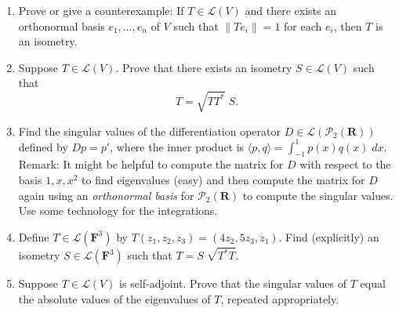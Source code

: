 \documentclass[12pt]{article}
\begin{document}
\begin{enumerate}
\item Prove or give a counterexample:  If $T \in \mathcal{L}(V)$ and there exists an orthonormal basis $e_1, \ldots , e_n$ of  $V$ such that $\|Te_i\| = 1$ for each $e_i$, then $T$ is an isometry.

\item Suppose $T \in \mathcal{L}(V)$.  Prove that there exists an isometry $S \in \mathcal{L}(V)$ such that
    \[
        T = \sqrt{TT^*}\;S.
    \]


\item Find the singular values of the differentiation operator $D \in \mathcal{L}(\mathcal{P}_2(\mathbf{R}))$ defined by $Dp = p'$, where the inner product is $\langle p , q \rangle = \int_{-1}^1 p(x)q(x)\;dx$.\\
    Remark: It might be helpful to compute the matrix for $D$ with respect to the basis $1, x, x^2$ to find eigenvalues (easy) and then compute the matrix for $D$ again using an \emph{orthonormal basis} for $\mathcal{P}_2(\mathbf{R})$ to compute the singular values.  Use some technology for the integrations.

\item Define $T \in \mathcal{L}(\mathbf{F}^3)$ by $T(z_1,z_2,z_3) = ( 4z_2 , 5z_3 , z_1 )$. Find (explicitly) an isometry $S \in \mathcal{L}(\mathbf{F}^3)$ such that $T = S\;\sqrt{T^*T}$.

\item Suppose $T \in \mathcal{L}(V)$ is self-adjoint.  Prove that the singular values of $T$ equal the absolute values of the eigenvalues of $T$, repeated appropriately.


\end{enumerate}
\end{document}
